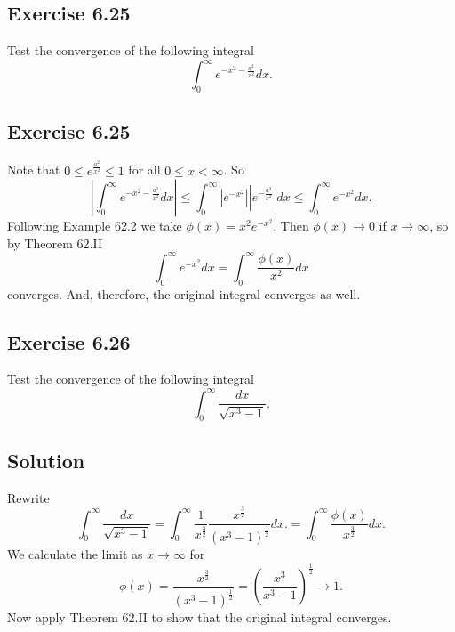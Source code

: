 \subsection*{Exercise 6.25}

Test the convergence of the following integral
\begin{equation*}
    \int_0^{\infty} e^{-x^2 - \frac{a^2}{x^2}} dx.
\end{equation*}

\subsection*{Exercise 6.25}

Note that $0 \leq e^{\frac{a^2}{x^2}} \leq 1$ for all $0 \leq x < \infty$.
So
\begin{equation*}
    \left| \int_0^{\infty} e^{-x^2 - \frac{a^2}{x^2}} dx \right|
        \leq \int_0^{\infty} \left|e^{-x^2}\right| \left|e^{-\frac{a^2}{x^2}}\right| dx
        \leq \int_0^{\infty} e^{-x^2} dx.
\end{equation*}
Following Example 62.2 we take $\phi(x) = x^2e^{-x^2}$.
Then $\phi(x) \to 0$ if $x \to \infty$, so by Theorem 62.II
\begin{equation*}
    \int_0^{\infty} e^{-x^2} dx = \int_0^{\infty} \frac{\phi(x)}{x^2} dx
\end{equation*}
converges.
And, therefore, the original integral converges as well.


\subsection*{Exercise 6.26}

Test the convergence of the following integral
\begin{equation*}
    \int_0^{\infty} \frac{dx}{\sqrt{x^3 - 1}}.
\end{equation*}

\subsection*{Solution}
Rewrite
\begin{equation*}
    \int_0^{\infty} \frac{dx}{\sqrt{x^3 - 1}}
        = \int_0^{\infty} \frac{1}{x^{\frac{3}{2}}} \frac{x^{\frac{3}{2}}}{(x^3 - 1)^{\frac{1}{2}}} dx.
        = \int_0^{\infty} \frac{\phi(x)}{x^{\frac{3}{2}}} dx.
\end{equation*}
We calculate the limit as $x \to \infty$ for
\begin{equation*}
    \phi(x) = \frac{x^{\frac{3}{2}}}{(x^3 - 1)^{\frac{1}{2}}}
        = \left( \frac{x^3}{x^3 - 1} \right)^{\frac{1}{2}}
        \to 1.
\end{equation*}
Now apply Theorem 62.II to show that the original integral converges.
